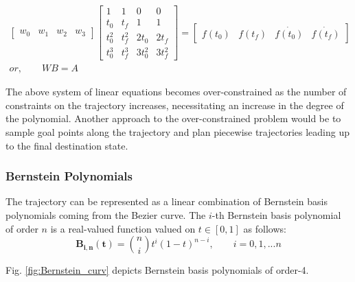 \begin{subequations}
 \begin{align}
    \begin{bmatrix}
        w_0 & w_1 & w_2 & w_3 
    \end{bmatrix} \begin{bmatrix}
        1 & 1 & 0 & 0 \\
        t_0 & t_f & 1 & 1 \\
        t_0^2 & t_f^2 & 2t_0 & 2t_f \\
        t_0^3 & t_f^3 & 3t_0^2 & 3t_f^2
    \end{bmatrix} = \begin{bmatrix}
        f(t_0) & f(t_f) & \dot{f(t_0)} & \dot{f(t_f)}
    \end{bmatrix}
    \\
or, \qquad WB = A \label{eqn:LP}
\end{align}   
\end{subequations}



The above system of linear equations becomes over-constrained as the number of constraints on the trajectory increases, necessitating an increase in the degree of the polynomial. Another approach to the over-constrained problem would be to sample goal points along the trajectory and plan piecewise trajectories leading up to the final destination state.

\subsubsection{Bernstein Polynomials}
The trajectory can be represented as a linear combination of Bernstein basis polynomials \cite{bernstein_gen} coming from the Bezier curve. The $i$-th Bernstein basis polynomial of order $n$ is a real-valued function valued on $t \in [0,1]$ as follows:
\begin{equation}
    \boldsymbol{B_{i,n}(t)} = {n \choose i}t^{i}(1-t)^{n-i}, \qquad i = 0,1,...n
\end{equation}

Fig. \ref{fig:Bernstein_curv} depicts Bernstein basis polynomials of order-4. 


